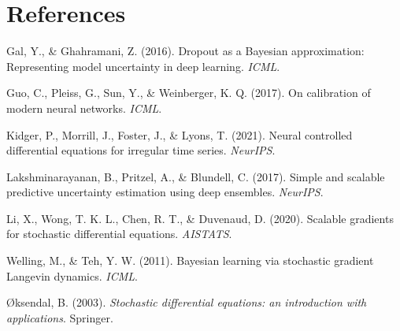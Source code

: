\documentclass[12pt,a4paper]{article}
\begin{document}
\section*{References}

\begin{enumerate}[leftmargin=1.5cm, label={[\arabic*]}]
\item Gal, Y., \& Ghahramani, Z. (2016). Dropout as a Bayesian approximation: Representing model uncertainty in deep learning. \textit{ICML}.

\item Guo, C., Pleiss, G., Sun, Y., \& Weinberger, K. Q. (2017). On calibration of modern neural networks. \textit{ICML}.

\item Kidger, P., Morrill, J., Foster, J., \& Lyons, T. (2021). Neural controlled differential equations for irregular time series. \textit{NeurIPS}.

\item Lakshminarayanan, B., Pritzel, A., \& Blundell, C. (2017). Simple and scalable predictive uncertainty estimation using deep ensembles. \textit{NeurIPS}.

\item Li, X., Wong, T. K. L., Chen, R. T., \& Duvenaud, D. (2020). Scalable gradients for stochastic differential equations. \textit{AISTATS}.

\item Welling, M., \& Teh, Y. W. (2011). Bayesian learning via stochastic gradient Langevin dynamics. \textit{ICML}.

\item Øksendal, B. (2003). \textit{Stochastic differential equations: an introduction with applications}. Springer.
\end{enumerate}
\end{document}
